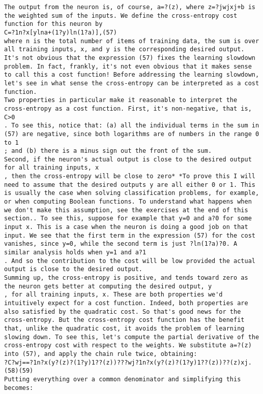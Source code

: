 \begin{lstlisting}
The output from the neuron is, of course, a=?(z), where z=?jwjxj+b is the weighted sum of the inputs. We define the cross-entropy cost function for this neuron by 
C=?1n?x[ylna+(1?y)ln(1?a)],(57)
where n is the total number of items of training data, the sum is over all training inputs, x, and y is the corresponding desired output.
It's not obvious that the expression (57) fixes the learning slowdown problem. In fact, frankly, it's not even obvious that it makes sense to call this a cost function! Before addressing the learning slowdown, let's see in what sense the cross-entropy can be interpreted as a cost function.
Two properties in particular make it reasonable to interpret the cross-entropy as a cost function. First, it's non-negative, that is, C>0
. To see this, notice that: (a) all the individual terms in the sum in (57) are negative, since both logarithms are of numbers in the range 0 to 1
; and (b) there is a minus sign out the front of the sum.
Second, if the neuron's actual output is close to the desired output for all training inputs, x
, then the cross-entropy will be close to zero* *To prove this I will need to assume that the desired outputs y are all either 0 or 1. This is usually the case when solving classification problems, for example, or when computing Boolean functions. To understand what happens when we don't make this assumption, see the exercises at the end of this section.. To see this, suppose for example that y=0 and a?0 for some input x. This is a case when the neuron is doing a good job on that input. We see that the first term in the expression (57) for the cost vanishes, since y=0, while the second term is just ?ln(1?a)?0. A similar analysis holds when y=1 and a?1
. And so the contribution to the cost will be low provided the actual output is close to the desired output.
Summing up, the cross-entropy is positive, and tends toward zero as the neuron gets better at computing the desired output, y
, for all training inputs, x. These are both properties we'd intuitively expect for a cost function. Indeed, both properties are also satisfied by the quadratic cost. So that's good news for the cross-entropy. But the cross-entropy cost function has the benefit that, unlike the quadratic cost, it avoids the problem of learning slowing down. To see this, let's compute the partial derivative of the cross-entropy cost with respect to the weights. We substitute a=?(z) into (57), and apply the chain rule twice, obtaining: 
?C?wj==?1n?x(y?(z)?(1?y)1??(z))???wj?1n?x(y?(z)?(1?y)1??(z))??(z)xj.(58)(59)
Putting everything over a common denominator and simplifying this becomes: 

\end{lstlisting}

